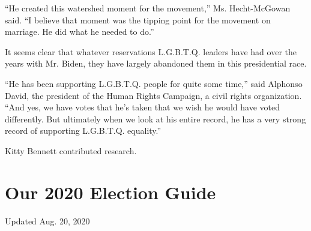 ``He created this watershed moment for the movement,'' Ms. Hecht-McGowan
said. ``I believe that moment was the tipping point for the movement on
marriage. He did what he needed to do.''

It seems clear that whatever reservations L.G.B.T.Q. leaders have had
over the years with Mr. Biden, they have largely abandoned them in this
presidential race.

``He has been supporting L.G.B.T.Q. people for quite some time,'' said
Alphonso David, the president of the Human Rights Campaign, a civil
rights organization. ``And yes, we have votes that he's taken that we
wish he would have voted differently. But ultimately when we look at his
entire record, he has a very strong record of supporting L.G.B.T.Q.
equality.''

Kitty Bennett contributed research.

\hypertarget{our-2020-election-guide}{%
\section{Our 2020 Election Guide}\label{our-2020-election-guide}}

Updated Aug. 20, 2020

